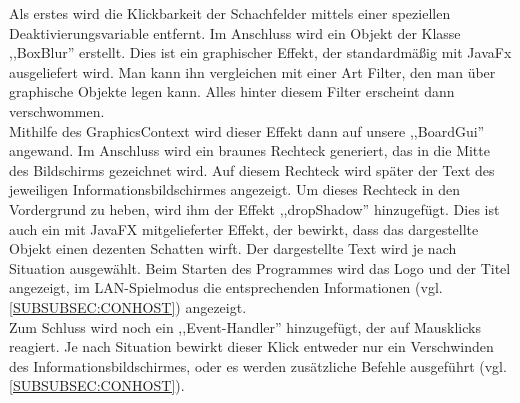 \documentclass[12pt,a4paper]{article}
\begin{document}
Als erstes wird die Klickbarkeit der Schachfelder mittels einer speziellen Deaktivierungsvariable entfernt. Im Anschluss wird ein Objekt der Klasse ,,BoxBlur'' erstellt. Dies ist ein graphischer Effekt, der standardmäßig mit JavaFx ausgeliefert wird. Man kann ihn vergleichen mit einer Art Filter, den man über graphische Objekte legen kann. Alles hinter diesem Filter erscheint dann verschwommen. \\
Mithilfe des GraphicsContext wird dieser Effekt dann auf unsere ,,BoardGui'' angewand. 
Im Anschluss wird ein braunes Rechteck generiert, das in die Mitte des Bildschirms gezeichnet wird. Auf diesem Rechteck wird später der Text des jeweiligen Informationsbildschirmes angezeigt. Um dieses Rechteck in den Vordergrund zu heben, wird ihm der Effekt ,,dropShadow'' hinzugefügt. Dies ist auch ein mit JavaFX mitgelieferter Effekt, der bewirkt, dass das dargestellte Objekt einen dezenten Schatten wirft.
Der dargestellte Text wird je nach Situation ausgewählt. Beim Starten des Programmes wird das Logo und der Titel angezeigt, im LAN-Spielmodus die entsprechenden Informationen (vgl. \ref{SUBSUBSEC:CONHOST}) angezeigt. \\
Zum Schluss wird noch ein ,,Event-Handler'' hinzugefügt, der auf Mausklicks reagiert. Je nach Situation bewirkt dieser Klick entweder nur ein Verschwinden des Informationsbildschirmes, oder es werden zusätzliche Befehle ausgeführt (vgl. \ref{SUBSUBSEC:CONHOST}). \\
\end{document}

